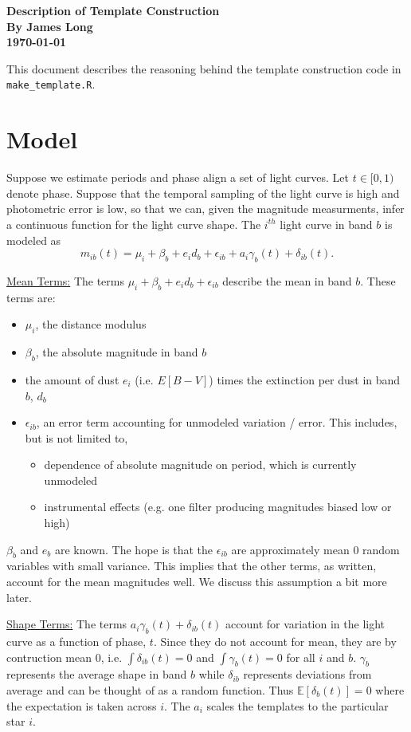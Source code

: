 \documentclass[12pt]{article}
\title{}
\date{}
\author{}
\newcommand{\E}{\mathbb{E}}
\begin{document}
\noindent
\textbf{Description of Template Construction}\\
\textbf{By James Long}\\
\textbf{\today}

This document describes the reasoning behind the template construction code in \texttt{make\_template.R}.

\section{Model}

Suppose we estimate periods and phase align a set of light curves. Let $t \in [0,1)$ denote phase. Suppose that the temporal sampling of the light curve is high and photometric error is low, so that we can, given the magnitude measurments, infer a continuous function for the light curve shape. The $i^{th}$ light curve in band $b$ is modeled as
\begin{equation*}
  m_{ib}(t) = \mu_i + \beta_b + e_id_b + \epsilon_{ib} + a_i\gamma_b(t) + \delta_{ib}(t).
\end{equation*}


\underline{Mean Terms:} The terms $\mu_i + \beta_b + e_id_b + \epsilon_{ib}$ describe the mean in band $b$. These terms are:
\begin{itemize}
\item $\mu_i$, the distance modulus
\item $\beta_b$, the absolute magnitude in band $b$
\item the amount of dust $e_i$ (i.e. $E[B-V]$) times the extinction per dust in band $b$, $d_b$
\item $\epsilon_{ib}$, an error term accounting for unmodeled variation / error. This includes, but is not limited to,
\begin{itemize}
  \item dependence of absolute magnitude on period, which is currently unmodeled
  \item instrumental effects (e.g. one filter producing magnitudes biased low or high)
\end{itemize}
\end{itemize}

$\beta_b$ and $e_b$ are known. The hope is that the $\epsilon_{ib}$ are approximately mean $0$ random variables with small variance. This implies that the other terms, as written, account for the mean magnitudes well. We discuss this assumption a bit more later.

\underline{Shape Terms:} The terms $a_i\gamma_b(t) + \delta_{ib}(t)$ account for variation in the light curve as a function of phase, $t$. Since they do not account for mean, they are by contruction mean 0, i.e. $\int \delta_{ib}(t) = 0$ and $\int \gamma_b(t) = 0$ for all $i$ and $b$. $\gamma_b$ represents the average shape in band $b$ while $\delta_{ib}$ represents deviations from average and can be thought of as a random function. Thus $\E[\delta_b(t)] = 0$ where the expectation is taken across $i$. The $a_i$ scales the templates to the particular star $i$.
\end{document}
